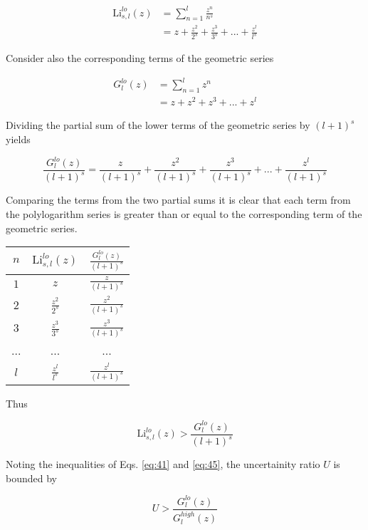 \documentclass[letterpaper,12pt]{article}
\newcommand{\Li}{\textrm{Li}}
\begin{document}
\begin{align} \label{eq:42}
\Li_{s,l}^{lo}(z) &= \sum_{n = 1}^{l} \frac{z^{n}}{n^{s}} \\
 &= z + \frac{z^{2}}{2^{s}} + \frac{z^{3}}{3^{s}} + ... + \frac{z^{l}}{l^{s}}
\end{align}

\noindent Consider also the corresponding terms of the geometric series

\begin{align} \label{eq:43}
G_{l}^{lo}(z) &= \sum_{n = 1}^{l} z^{n} \\
 &= z + z^{2} + z^{3} + ... + z^{l}
\end{align}

\noindent Dividing the partial sum of the lower terms of the geometric series by $(l+1)^{s}$ yields

\begin{equation} \label{eq:44}
\frac{G_{l}^{lo}(z)}{(l+1)^{s}} = \frac{z}{(l+1)^{s}} + \frac{z^{2}}{(l+1)^{s}} + \frac{z^{3}}{(l+1)^{s}} + ... + \frac{z^{l}}{(l+1)^{s}}
\end{equation}

Comparing the terms from the two partial sums it is clear that each term from the polylogarithm series is greater than or equal to the corresponding term of the geometric series.

\begin{tabular}{ccc}
$n$ & $\Li_{s,l}^{lo}(z)$ & $\frac{G_{l}^{lo}(z)}{(l+1)^{s}}$ \\
\hline
$1$ & $z$ & $\frac{z}{(l+1)^{s}}$ \\
$2$ & $\frac{z^{2}}{2^{s}}$ & $\frac{z^{2}}{(l+1)^{s}}$ \\
$3$ & $\frac{z^{3}}{3^{s}}$ & $\frac{z^{3}}{(l+1)^{s}}$ \\
... & ... & ... \\
$l$ & $\frac{z^{l}}{l^{s}}$ & $\frac{z^{l}}{(l+1)^{s}}$ \\
\end{tabular}

\noindent Thus

\begin{equation} \label{eq:45}
\Li_{s,l}^{lo}(z) > \frac{G_{l}^{lo}(z)}{(l+1)^{s}}
\end{equation}

Noting the inequalities of Eqs. \ref{eq:41} and \ref{eq:45}, the uncertainity ratio $U$ is bounded by

\begin{equation} \label{eq:46}
U > \frac{G_{l}^{lo}(z)}{G_{l}^{high}(z)}
\end{equation}
\end{document}
